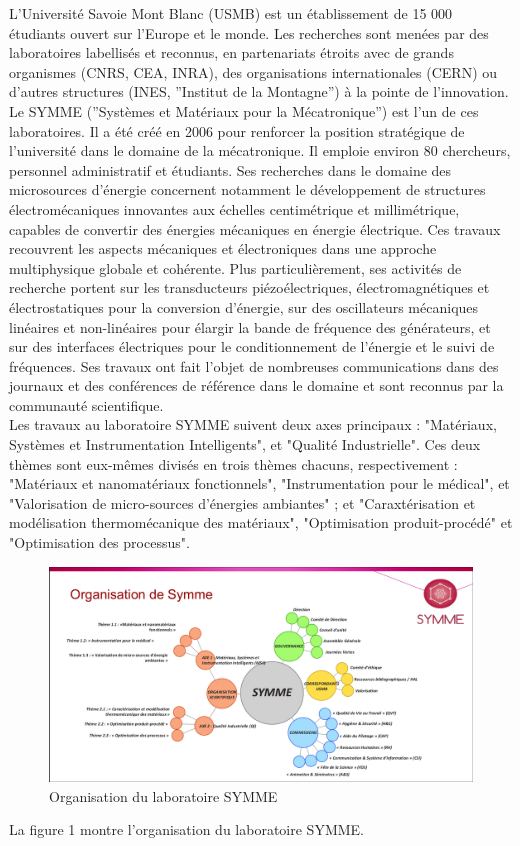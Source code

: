 \documentclass[a4paper, french, 12pt, titlepage]{article}
\begin{document}
L’Université Savoie Mont Blanc (USMB) est un établissement de 15 000 étudiants ouvert sur l’Europe et le monde. Les recherches sont menées par des laboratoires labellisés et reconnus, en partenariats étroits avec de grands organismes (CNRS, CEA, INRA), des organisations internationales (CERN) ou d’autres structures (INES, ”Institut de la Montagne”) à la pointe de l’innovation. Le SYMME (”Systèmes et Matériaux pour la Mécatronique”) est l’un de ces laboratoires. Il a été créé en 2006 pour renforcer la position stratégique de l’université dans le domaine de la mécatronique. Il emploie environ 80 chercheurs, personnel administratif et étudiants. Ses recherches dans le domaine des microsources d’énergie concernent notamment le développement de structures électromécaniques innovantes aux échelles centimétrique et millimétrique, capables de convertir des énergies mécaniques en énergie électrique. Ces travaux recouvrent les aspects mécaniques et électroniques dans une approche multiphysique globale et cohérente. Plus particulièrement, ses activités de recherche portent sur les transducteurs piézoélectriques, électromagnétiques et électrostatiques pour la conversion d’énergie, sur des oscillateurs mécaniques linéaires et non-linéaires pour élargir la bande de fréquence des générateurs, et sur des interfaces électriques pour le conditionnement de l’énergie et le suivi de fréquences. Ses travaux ont fait l’objet de nombreuses communications dans des journaux et des conférences de référence dans le domaine et sont reconnus par la communauté scientifique.\\


Les travaux au laboratoire SYMME suivent deux axes principaux : "Matériaux, Systèmes et Instrumentation Intelligents", et "Qualité Industrielle". Ces deux thèmes sont eux-mêmes divisés en trois thèmes chacuns, respectivement : "Matériaux et nanomatériaux fonctionnels", "Instrumentation pour le médical", et "Valorisation de micro-sources d'énergies ambiantes" ; et "Caraxtérisation et modélisation thermomécanique des matériaux", "Optimisation produit-procédé" et "Optimisation des processus". \\

\begin{figure}
  \includegraphics[width=\linewidth]{organigramme.png}
  \caption{Organisation du laboratoire SYMME}
  \label{fig:organigramme}
\end{figure}
La figure 1 montre l'organisation du laboratoire SYMME. 
\end{document}
